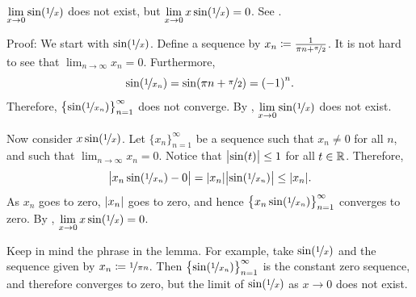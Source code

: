 \begin{example}
$\displaystyle \lim_{x \to 0} \sin( \nicefrac{1}{x} )$
does not exist, but 
$\displaystyle \lim_{x \to 0} x\sin( \nicefrac{1}{x} ) = 0$.
See .

\begin{myfigureht}
\caption{Graphs of $\sin(\nicefrac{1}{x})$ and $x \sin(\nicefrac{1}{x})$.
Note that the computer cannot properly graph $\sin(\nicefrac{1}{x})$
near zero as it oscillates too fast.\label{figsin1x}}
\end{myfigureht}

Proof:
We start with $\sin(\nicefrac{1}{x})$.  Define a sequence
by
$x_n \coloneqq \frac{1}{\pi n + \nicefrac{\pi}{2}}$.  It is not hard to see
that $\lim_{n\to\infty} x_n = 0$.  Furthermore,
\begin{equation*}
\sin ( \nicefrac{1}{x_n} )
=
\sin (\pi n + \nicefrac{\pi}{2})
= {(-1)}^n .
\end{equation*}
Therefore, $\bigl\{ \sin ( \nicefrac{1}{x_n} ) \bigr\}_{n=1}^\infty$ does not converge.
By
, 
$\displaystyle \lim_{x \to 0} \sin( \nicefrac{1}{x} )$ does not exist.

Now consider $x\sin(\nicefrac{1}{x})$.  Let $\{ x_n \}_{n=1}^\infty$ be a sequence
such that $x_n \neq 0$ for all $n$, and such that $\lim_{n\to\infty} x_n = 0$.
Notice that $\bigl\lvert {\sin(t)} \bigr\rvert \leq 1$ for all $t \in {\mathbb{R}}$.  Therefore,
\begin{equation*}
\bigl\lvert {x_n\sin(\nicefrac{1}{x_n})-0} \bigr\rvert
=
\lvert {x_n} \rvert\bigl\lvert {\sin(\nicefrac{1}{x_n})} \bigr\rvert
\leq
\lvert {x_n} \rvert .
\end{equation*}
As $x_n$ goes to zero, $\lvert {x_n} \rvert$ goes to zero, and hence
$\bigl\{ x_n\sin(\nicefrac{1}{x_n}) \bigr\}_{n=1}^\infty$ converges to zero.  By
, 
$\displaystyle \lim_{x \to 0} x\sin( \nicefrac{1}{x} ) = 0$.
\end{example}

Keep in mind the phrase  in the lemma.
For example, take $\sin(\nicefrac{1}{x})$ and the sequence given by
$x_n \coloneqq \nicefrac{1}{\pi n}$.
Then $\bigl\{ \sin (\nicefrac{1}{x_n}) \bigr\}_{n=1}^\infty$
is the constant zero sequence, and
therefore converges to zero, but the limit of 
$\sin(\nicefrac{1}{x})$ as $x \to 0$ does not exist.

